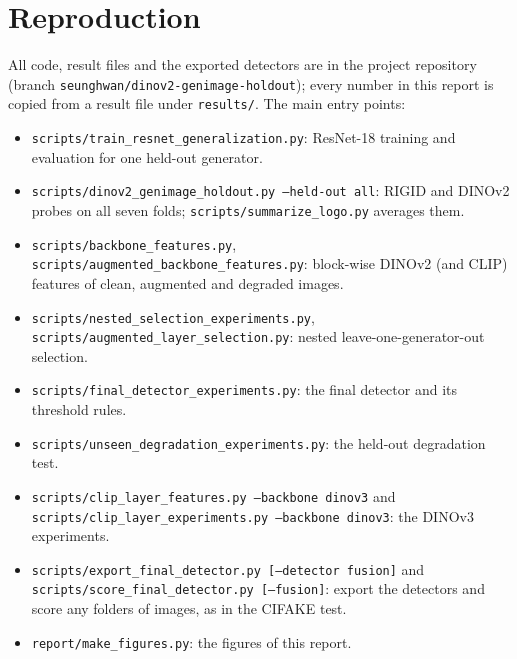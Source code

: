 \documentclass[10pt,a4paper]{article}
\begin{document}
\section{Reproduction}
All code, result files and the exported detectors are in the project repository (branch \texttt{seunghwan/dinov2-genimage-holdout}); every number in this report is copied from a result file under \texttt{results/}. The main entry points:
\begin{itemize}
  \item \texttt{scripts/train\_resnet\_generalization.py}: ResNet-18 training and evaluation for one held-out generator.
  \item \texttt{scripts/dinov2\_genimage\_holdout.py --held-out all}: RIGID and DINOv2 probes on all seven folds; \texttt{scripts/summarize\_logo.py} averages them.
  \item \texttt{scripts/backbone\_features.py}, \texttt{scripts/augmented\_backbone\_features.py}: block-wise DINOv2 (and CLIP) features of clean, augmented and degraded images.
  \item \texttt{scripts/nested\_selection\_experiments.py}, \texttt{scripts/augmented\_layer\_selection.py}: nested leave-one-generator-out selection.
  \item \texttt{scripts/final\_detector\_experiments.py}: the final detector and its threshold rules.
  \item \texttt{scripts/unseen\_degradation\_experiments.py}: the held-out degradation test.
  \item \texttt{scripts/clip\_layer\_features.py --backbone dinov3} and \texttt{scripts/clip\_layer\_experiments.py --backbone dinov3}: the DINOv3 experiments.
  \item \texttt{scripts/export\_final\_detector.py [--detector fusion]} and \texttt{scripts/score\_final\_detector.py [--fusion]}: export the detectors and score any folders of images, as in the CIFAKE test.
  \item \texttt{report/make\_figures.py}: the figures of this report.
\end{itemize}
\end{document}
